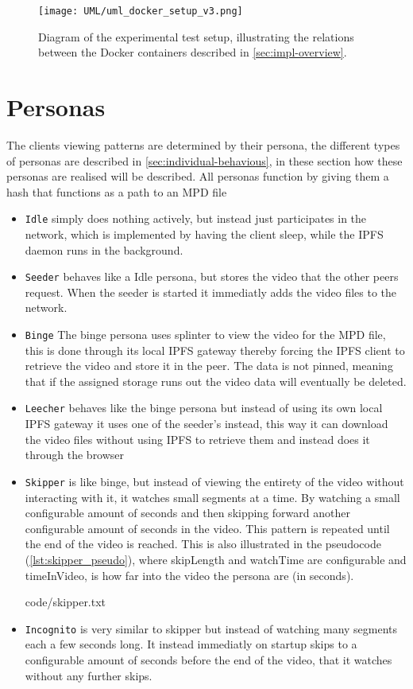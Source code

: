 \begin{figure}[bth]
    \texttt{[image: UML/uml\_docker\_setup\_v3.png]}
    \caption[Diagram of the experimental test  setup]{Diagram of the experimental test setup, illustrating the relations between the Docker containers described in \autoref{sec:impl-overview}.}
    \label{fig:uml_docker-compose}
\end{figure}

\section{Personas}
The clients viewing patterns are determined by their persona, the different types of personas are described in \autoref{sec:individual-behavious}, in these section how these personas are realised will be described.
All personas function by giving them a hash that functions as a path to an \acs{MPD} file
\begin{itemize}
    \item \texttt{Idle} simply does nothing actively, but instead just participates in the network, which is implemented by having the client sleep, while the \acs{IPFS} daemon runs in the background.
    \item \texttt{Seeder} behaves like a Idle persona, but stores the video that the other peers request. When the seeder is started it immediatly adds the video files to the network.
    \item \texttt{Binge} The binge persona uses splinter to view the video for the \acs{MPD} file, this is done through its local \acs{IPFS} gateway thereby forcing the \acs{IPFS} client to retrieve the video and store it in the peer. The data is not pinned, meaning that if the assigned storage runs out the video data will eventually be deleted.
    \item \texttt{Leecher} behaves like the binge persona but instead of using its own local \acs{IPFS} gateway it uses one of the seeder's instead, this way it can download the video files without using \acs{IPFS} to retrieve them and instead does it through the browser
    \item \texttt{Skipper} is like binge, but instead of viewing the entirety of the video without interacting with it, it watches small segments at a time. By watching a small configurable amount of seconds and then skipping forward another configurable amount of seconds  in the video. This pattern is repeated until the end of the video is reached. This is also illustrated in the pseudocode (\autoref{lst:skipper_pseudo}), where skipLength and watchTime are configurable and timeInVideo, is how far into the video the persona are (in seconds).
    
    {code/skipper.txt}
    \item \texttt{Incognito} is very similar to skipper but instead of watching many segments each a few seconds long. It instead immediatly on startup skips to a configurable amount of seconds before the end of the video, that it watches without any further skips.
\end{itemize}
